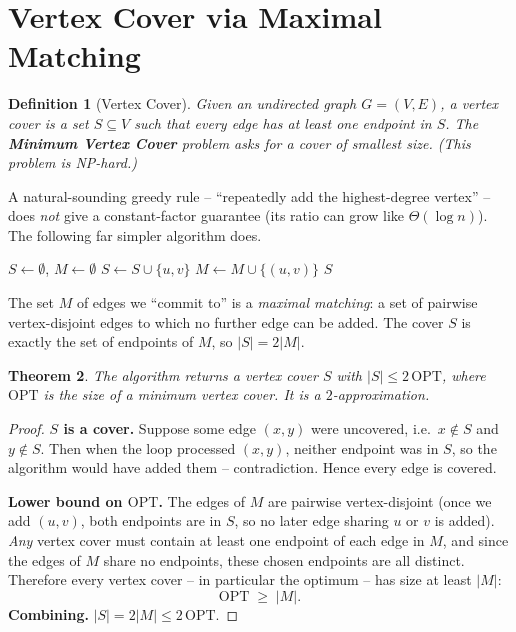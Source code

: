 \documentclass[11pt]{article}
\newtheorem{theorem}{Theorem}[section]
\newtheorem{definition}[theorem]{Definition}
\begin{document}
\section{Vertex Cover via Maximal Matching}

\begin{definition}[Vertex Cover]
Given an undirected graph $G = (V, E)$, a \emph{vertex cover} is a set $S \subseteq V$
such that every edge has at least one endpoint in $S$. The \textbf{Minimum Vertex Cover}
problem asks for a cover of smallest size. (This problem is NP-hard.)
\end{definition}

A natural-sounding greedy rule -- ``repeatedly add the highest-degree vertex'' -- does
\emph{not} give a constant-factor guarantee (its ratio can grow like $\Theta(\log n)$).
The following far simpler algorithm does.

\begin{algorithm}[h]
\caption{Vertex Cover via Maximal Matching (Problem 1)}
\begin{algorithmic}[1]
\State $S \gets \emptyset$, $M \gets \emptyset$ 
        \State $S \gets S \cup \{u, v\}$ 
        \State $M \gets M \cup \{(u,v)\}$
    \EndIf
\EndFor
\State \Return $S$
\end{algorithmic}
\end{algorithm}

The set $M$ of edges we ``commit to'' is a \emph{maximal matching}: a set of pairwise
vertex-disjoint edges to which no further edge can be added. The cover $S$ is exactly the
set of endpoints of $M$, so $|S| = 2|M|$.

\begin{theorem}
\label{thm:vc}
The algorithm returns a vertex cover $S$ with $|S| \le 2\,\mathrm{OPT}$, where
$\mathrm{OPT}$ is the size of a minimum vertex cover. It is a $2$-approximation.
\end{theorem}

\begin{proof}
\textbf{$S$ is a cover.} Suppose some edge $(x, y)$ were uncovered, i.e.\ $x \notin S$ and
$y \notin S$. Then when the loop processed $(x,y)$, neither endpoint was in $S$, so the
algorithm would have added them -- contradiction. Hence every edge is covered.

\textbf{Lower bound on $\mathrm{OPT}$.} The edges of $M$ are pairwise vertex-disjoint
(once we add $(u,v)$, both endpoints are in $S$, so no later edge sharing $u$ or $v$ is
added). \emph{Any} vertex cover must contain at least one endpoint of each edge in $M$,
and since the edges of $M$ share no endpoints, these chosen endpoints are all distinct.
Therefore every vertex cover -- in particular the optimum -- has size at least $|M|$:
\[
    \mathrm{OPT} \;\ge\; |M|.
\]
\textbf{Combining.} $|S| = 2|M| \le 2\,\mathrm{OPT}$.
\end{proof}
\end{document}
